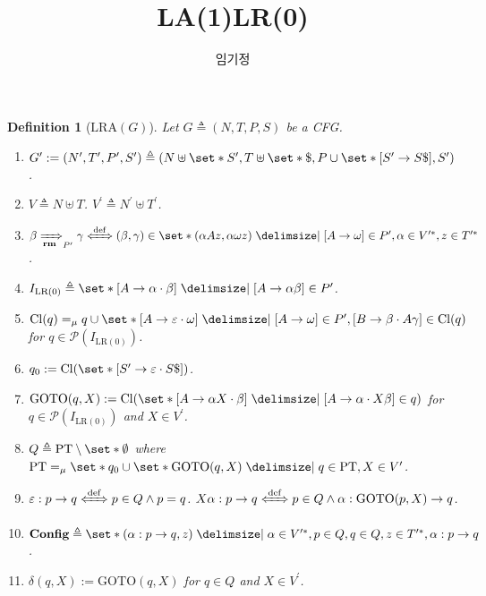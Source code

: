 \documentclass[12pt]{article}
\title{LA{(1)}LR{(0)}}
\author{임기정}
\newtheorem{definition}[theorem]{Definition}
\newcommand{\powerset}{ \ensuremath{\mathcal{P}} }
\begin{document}
\thispagestyle{empty}

\begin{definition}[$\mathrm{LRA}(G)$]
Let \(G \triangleq ( N , T , P , S )\) be a CFG{.}
\begin{enumerate} \setlength{\itemsep}{0.2pt} \setlength{\parskip}{0.2pt}
\item[$\mathrm{(i)}$] $G^\prime := ( N^\prime , T^\prime , P^\prime , S^\prime ) \triangleq ( N \uplus \set*{ S^\prime } , T \uplus \set*{ \$ } , P \cup \set*{ [ S^\prime \to S \$ ] } , S^\prime )$.
\item[$\mathrm{(ii)}$] $V \triangleq N \uplus T$. $V^\prime \triangleq N^\prime \uplus T^\prime$.
\item[$\mathrm{(iii)}$] $\beta \xRightarrow[\mathbf{rm}]{}_{P^\prime} \gamma \xLeftrightarrow[]{\mathrm{def}} ( \beta , \gamma ) \in \set*{ ( \alpha A z , \alpha \omega z ) \mid [ A \to \omega ] \in P^\prime , \alpha \in V^{\prime \ast}, z \in T^{\prime \ast} }$.
\item[$\mathrm{(iv)}$] $I_{\mathrm{LR(0)}} \triangleq \set*{ [ A \to \alpha \cdot \beta ] \mid [ A \to \alpha \beta ] \in P^\prime }$.
\item[$\mathrm{(v)}$] $\mathrm{Cl} ( q ) =_\mu q \cup \set*{ [ A \to \varepsilon \cdot \omega ] \mid [ A \to \omega ] \in P^\prime , [ B \to \beta \cdot A \gamma ] \in \mathrm{Cl} ( q ) }$ for $ q \in \powerset ( I_{\mathrm{LR(0)}} ) $.
\item[$\mathrm{(vi)}$] $q_0 := \mathrm{Cl} ( \set*{ [ S^\prime \to \varepsilon \cdot S \$ ] } )$.
\item[$\mathrm{(vii)}$] $\mathrm{GOTO} ( q , X ) := \mathrm{Cl} ( \set*{ [ A \to \alpha X \cdot \beta ] \mid [ A \to \alpha \cdot X \beta ] \in q } )$ for $q \in \powerset ( I_{\mathrm{LR(0)}} )$ and $X \in V^\prime$.
\item[$\mathrm{(vii)}$] $Q \triangleq \mathrm{PT} \setminus \set*{ \emptyset }$ where $\mathrm{PT} =_\mu \set*{ q_0 } \cup \set*{ \mathrm{GOTO} ( q , X ) \mid q \in \mathrm{PT} , X \in V^\prime }$.
\item[$\mathrm{(ix)}$] $\varepsilon : p \to q \xLeftrightarrow[]{\mathrm{def}} p \in Q \land p = q$. $X \alpha : p \to q \xLeftrightarrow[]{\mathrm{def}} p \in Q \land \alpha : \mathrm{GOTO} ( p , X ) \to q$.
\item[$\mathrm{(x)}$] $\mathbf{Config} \triangleq \set*{ ( \alpha : p \to q , z ) \mid \alpha \in V^{\prime \ast}, p \in Q , q \in Q , z \in T^{\prime \ast} , \alpha : p \to q } $.
\item[$\mathrm{(xi)}$] $\delta ( q , X ) := \mathrm{GOTO} ( q , X )$ for $q \in Q$ and $X \in V^\prime$.

\end{enumerate}
\end{definition}
\end{document}
